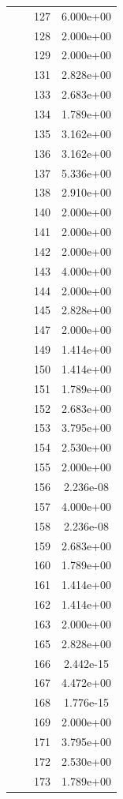 \documentclass[12pt]{article}
\begin{document}
\begin{longtable}{@{}cccc@{}}
 &  & 127 & 6.000e+00 \\
 &  & 128 & 2.000e+00 \\
 &  & 129 & 2.000e+00 \\
 &  & 131 & 2.828e+00 \\
 &  & 133 & 2.683e+00 \\
 &  & 134 & 1.789e+00 \\
 &  & 135 & 3.162e+00 \\
 &  & 136 & 3.162e+00 \\
 &  & 137 & 5.336e+00 \\
 &  & 138 & 2.910e+00 \\
 &  & 140 & 2.000e+00 \\
 &  & 141 & 2.000e+00 \\
 &  & 142 & 2.000e+00 \\
 &  & 143 & 4.000e+00 \\
 &  & 144 & 2.000e+00 \\
 &  & 145 & 2.828e+00 \\
 &  & 147 & 2.000e+00 \\
 &  & 149 & 1.414e+00 \\
 &  & 150 & 1.414e+00 \\
 &  & 151 & 1.789e+00 \\
 &  & 152 & 2.683e+00 \\
 &  & 153 & 3.795e+00 \\
 &  & 154 & 2.530e+00 \\
 &  & 155 & 2.000e+00 \\
 &  & 156 & 2.236e-08 \\
 &  & 157 & 4.000e+00 \\
 &  & 158 & 2.236e-08 \\
 &  & 159 & 2.683e+00 \\
 &  & 160 & 1.789e+00 \\
 &  & 161 & 1.414e+00 \\
 &  & 162 & 1.414e+00 \\
 &  & 163 & 2.000e+00 \\
 &  & 165 & 2.828e+00 \\
 &  & 166 & 2.442e-15 \\
 &  & 167 & 4.472e+00 \\
 &  & 168 & 1.776e-15 \\
 &  & 169 & 2.000e+00 \\
 &  & 171 & 3.795e+00 \\
 &  & 172 & 2.530e+00 \\
 &  & 173 & 1.789e+00 \\

\end{longtable}
\end{document}
